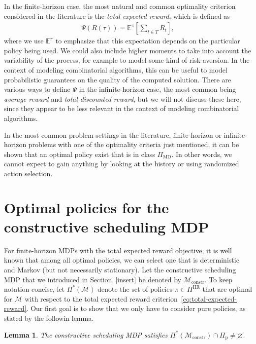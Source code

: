 \documentclass[11pt,a4paper]{article}
\newtheorem{lemma}{Lemma}[section]
\theoremstyle{remark}
\newcommand\note[1]{{\color{Navy}\noindent\scriptsize#1}}
\begin{document}
In the finite-horizon case, the most natural and common optimality criterion
considered in the literature is the \emph{total expected reward}, which is
defined as
\begin{align}
  \label{eq:total-expected-reward}
  \Psi(R(\tau)) = \mathbb{E}^\pi \left[ \sum_{t \in T} R_t \right] ,
\end{align}
where we use $\mathbb{E}^\pi$ to emphasize that this expectation depends on the
particular policy being used.
%
We could also include higher moments to take into account the variability of the
process, for example to model some kind of risk-aversion. In the context of
modeling combinatorial algorithms, this can be useful to model probabilistic
guarantees on the quality of the computed solution.
%
There are various ways to define $\Psi$ in the infinite-horizon case, the most
common being \emph{average reward} and \emph{total discounted reward}, but we will not discuss
these here, since they appear to be less relevant in the context of modeling
combinatorial algorithms.

In the most common problem settings in the literature, finite-horizon or
infinite-horizon problems with one of the optimality criteria just mentioned, it
can be shown that an optimal policy exist that is in class $\Pi_\textrm{MD}$. In
other words, we cannot expect to gain anything by looking at the history or
using randomized action selection.


\section{Optimal policies for the constructive scheduling MDP}

For finite-horizon MDPs with the total expected reward objective, it is well
known that among all optimal policies, we can select one that is deterministic
and Markov (but not necessarily stationary).
%
Let the constructive scheduling MDP that we introduced in
Section~\note{[insert]} be denoted by $\mathcal{M}_\mathrm{constr}$.
%
To keep notation concise, let $\Pi^*(\mathcal{M})$ denote the set of policies
$\pi \in \Pi^\mathrm{HR}$ that are optimal for $\mathcal{M}$ with respect to the
total expected reward criterion~\eqref{eq:total-expected-reward}.
%
Our first goal is to show that we only have to consider pure policies, as stated
by the followin lemma.

\begin{lemma}
  The constructive scheduling MDP satisfies
  $\Pi^*(\mathcal{M}_\mathrm{constr}) \cap \Pi_\mathrm{p} \neq \varnothing$.
\end{lemma}
\end{document}
